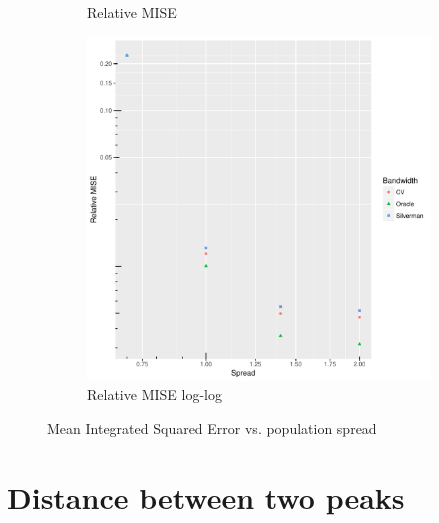 \begin{figure}[htbp]
\begin{subfigure}[b]{0.3\textwidth}
    \caption{Relative MISE}
    \end{subfigure}
    \begin{subfigure}[b]{0.3\textwidth}
    \includegraphics[width=\textwidth]{results/by_population_spread/RMISE-vs-population-spread-log-log}
    \caption{Relative MISE log-log}
    \end{subfigure}
    \caption[MISE: by risk spread]{Mean Integrated Squared Error vs. population spread}
    \label{fig:ise:pSD_100_1h}
\end{figure}


\section{Distance between two peaks}
\label{sec:results:p1.4_100_G}

